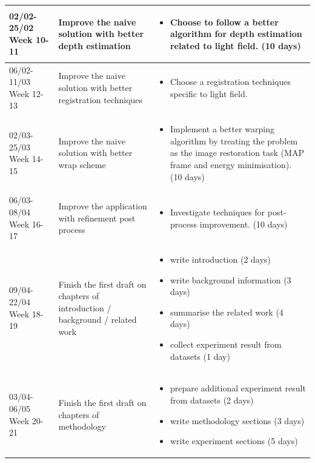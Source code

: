 \documentclass[11pt]{article}
\begin{document}
\begin{longtable}{|p{}|p{}|p{}|}
  02/02-25/02 Week 10-11&
  Improve the naive solution with better depth estimation &
  \begin{itemize}
    \item Choose to follow a better algorithm for depth estimation related to
      light field. \cite{jeon2015accurate} \cite{wang2016depth} (10 days)
  \end{itemize}
  \\ \hline

  06/02-11/03 Week 12-13&
  Improve the naive solution with better registration techniques &
  \begin{itemize}
    \item Choose a registration techniques specific to light field.
      \cite{mukati2016light}
  \end{itemize}
  \\ \hline

  02/03-25/03 Week 14-15&
  Improve the naive solution with better wrap scheme &
  \begin{itemize}
    \item Implement a better warping algorithm by treating the problem as the
      image restoration task (MAP frame and energy minimisation).
      \cite{rossi2017graph} (10 days)
  \end{itemize}
  \\ \hline

  06/03-08/04 Week 16-17&
  Improve the application with refinement post process &
  \begin{itemize}
    \item Investigate techniques for post-process improvement. (10 days)
  \end{itemize}
  \\ \hline

  09/04-22/04 Week 18-19&
  Finish the first draft on chapters of introduction / background / related work
  &
  \begin{itemize}
    \item write introduction (2 days)
    \item write background information (3 days)
    \item summarise the related work (4 days)
    \item collect experiment result from datasets (1 day)
  \end{itemize}
  \\ \hline

  03/04-06/05 Week 20-21&
  Finish the first draft on chapters of methodology &
  \begin{itemize}
    \item prepare additional experiment result from datasets (2 days)
    \item write methodology sections (3 days)
    \item write experiment sections (5 days)
  \end{itemize}
  \\ \hline


\end{longtable}
\end{document}

